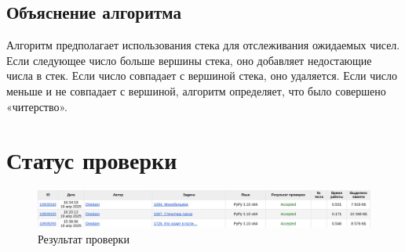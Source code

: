 \documentclass[a4paper,12pt]{article}
\begin{document}
\subsection*{Объяснение алгоритма}
Алгоритм предполагает использования стека для отслеживания ожидаемых чисел. Если следующее число больше вершины стека, оно добавляет недостающие числа в стек. Если число совпадает с вершиной стека, оно удаляется. Если число меньше и не совпадает с вершиной, алгоритм определяет, что было совершено «читерство».


\section*{Статус проверки}
\begin{figure}[H]
    \centering
    \includegraphics[width=1\textwidth]{check_status.png}
    \caption{Результат проверки}
    \label{fig:compiler-status}
\end{figure}
\end{document}
